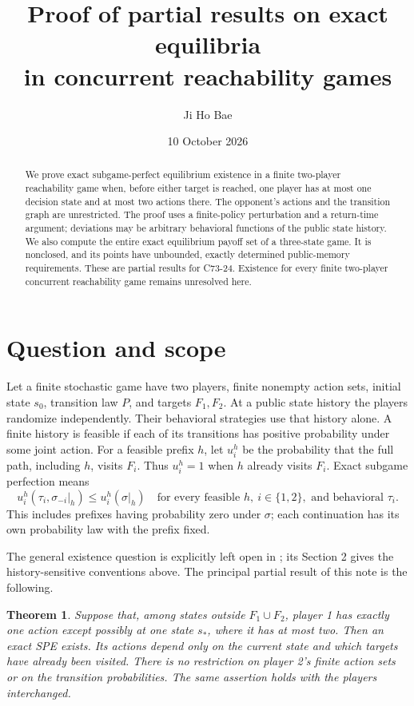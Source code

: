 \documentclass[11pt]{article}
\title{Proof of partial results on exact equilibria\\in concurrent reachability games}
\author{Ji Ho Bae}
\date{10 October 2026}
\newtheorem{theorem}{Theorem}
\begin{document}
\maketitle
\begin{abstract}
We prove exact subgame-perfect equilibrium existence in a finite two-player
reachability game when, before either target is reached, one player has
at most one decision state and at most two actions there. The opponent's
actions and the transition graph are unrestricted. The proof uses a
finite-policy perturbation and a return-time argument; deviations may be
arbitrary behavioral functions of the public state history. We also compute
the entire exact equilibrium payoff set of a three-state game. It is
nonclosed, and its points have unbounded, exactly determined public-memory
requirements. These are partial results for C73-24. Existence for every
finite two-player concurrent reachability game remains unresolved here.
\end{abstract}

\section{Question and scope}
Let a finite stochastic game have two players, finite nonempty action sets,
initial state $s_0$, transition law $P$, and targets $F_1,F_2$.
At a public state history the players randomize independently. Their
behavioral strategies use that history alone. A finite history is feasible
if each of its transitions has positive probability under some joint action.
For a feasible prefix $h$, let $u_i^h$ be the probability that the full
path, including $h$, visits $F_i$. Thus $u_i^h=1$ when $h$ already visits
$F_i$. Exact subgame perfection means
\begin{equation}\label{eq:spe}
 u_i^h(\tau_i,\sigma_{-i}|_h)\leq u_i^h(\sigma|_h)
 \quad\text{for every feasible }h,\ i\in\{1,2\},\text{ and behavioral }\tau_i.
\end{equation}
This includes prefixes having probability zero under $\sigma$; each
continuation has its own probability law with the prefix fixed.

The general existence question is explicitly left open in
\cite[Section 1]{RV}; its Section 2 gives the history-sensitive conventions
above. The principal partial result of this note is the following.

\begin{theorem}\label{thm:reach}
Suppose that, among states outside $F_1\cup F_2$, player 1 has exactly one
action except possibly at one state $s_*$, where it has at most two.
Then an exact SPE exists. Its actions depend only on the current state
and which targets have already been visited. There is no restriction on
player 2's finite action sets or on the transition probabilities.
The same assertion holds with the players interchanged.
\end{theorem}
\end{document}
